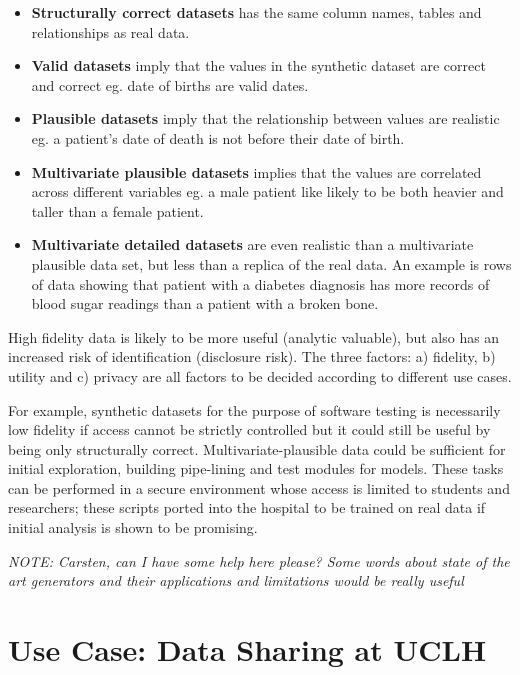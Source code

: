 \documentclass[11pt]{article}
\begin{document}
\begin{itemize}
    \item \textbf{Structurally correct datasets} has the same column names, tables and relationships as real data. 
    \item \textbf{Valid datasets} imply that the values in the synthetic dataset are correct and correct eg. date of births are valid dates. 
    \item \textbf{Plausible datasets} imply that the relationship between values are realistic eg. a patient's date of death is not before their date of birth.
    \item \textbf{Multivariate plausible datasets} implies that the values are correlated across different variables eg. a male patient like likely to be both heavier and taller than a female patient. 
    \item \textbf{Multivariate detailed datasets} are even realistic than a multivariate plausible data set, but less than a replica of the real data. An example is rows of data showing that patient with a diabetes diagnosis has more records of blood sugar readings than a patient with a broken bone.
\end{itemize}

High fidelity data is likely to be more useful (analytic valuable), but also has an increased risk of identification (disclosure risk). The three factors: a) fidelity, b) utility and c) privacy are all factors to be decided according to different use cases. 

For example, synthetic datasets for the purpose of software testing is necessarily low fidelity if access cannot be strictly controlled but it could still be useful by being only structurally correct.  Multivariate-plausible data could be sufficient for initial exploration, building pipe-lining and test modules for models. These tasks can be performed in a secure environment whose access is limited to students and researchers; these scripts ported into the hospital to be trained on real data if initial analysis is shown to be promising.

\textit{NOTE: Carsten, can I have some help here please? Some words about state of the art generators and their applications and limitations would be really useful}

\section{Use Case: Data Sharing at UCLH}
\end{document}
